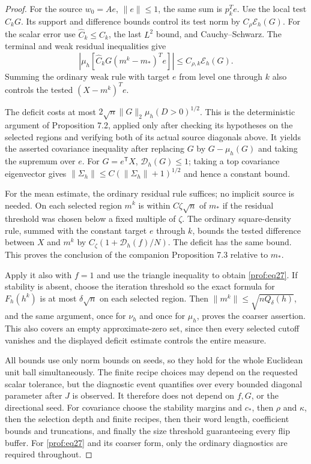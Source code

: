 \begin{proof}
For the source \(w_0=Ae\), \(\|e\|\le1\), the same sum is
\(p_k^Te\). Use the local test \(\widehat C_kG\).
Its support and difference bounds control its test norm by
\(C_\rho\mathcal E_h(G)\). For the scalar error use
\(\widehat C_k\le C_k\), the last \(L^2\) bound, and
Cauchy--Schwarz. The terminal and weak residual inequalities give
\[
 |\mu_h[\widehat C_kG(m^k-m_*)^Te]|
       \le C_{\rho,k}\mathcal E_h(G).
\]
Summing the ordinary weak rule with target \(e\) from level one
through \(k\) also controls the tested \((X-m^k)^Te\).

The deficit costs at most
$2\sqrt n\|G\|_2\mu_h(D>0)^{1/2}$.
This is the deterministic argument of Proposition 7.2, applied only
after checking its hypotheses on the selected regions and verifying
both of its actual source diagonals above.  It yields the asserted covariance inequality after
replacing $G$ by $G-\mu_h(G)$ and taking the supremum over $e$.
For $G=e^{\mathsf T}X$, $\mathcal D_h(G)\le1$; taking a top covariance
eigenvector gives $\|\Sigma_h\|\le C(\|\Sigma_h\|+1)^{1/2}$ and hence
a constant bound.

For the mean estimate, the ordinary residual rule suffices; no implicit
source is needed.  On each selected
region $m^k$ is within $C\zeta\sqrt n$ of $m_*$ if the residual
threshold was chosen below a fixed multiple of $\zeta$.
The ordinary square-density rule, summed with the constant target $e$
through $k$, bounds the tested difference between $X$ and $m^k$ by
$C_\zeta(1+\mathcal D_h(f)/N)$.  The deficit has the same bound.
This proves the conclusion of the companion Proposition 7.3 relative
to $m_*$.

Apply it also with $f=1$ and use the triangle inequality
to obtain \eqref{prof:eq27}.
If stability is absent, choose the iteration threshold so the exact
formula for $F_h(h^k)$ is at most $\delta\sqrt n$ on each selected
region.  Then $\|m^k\|\le\sqrt{nQ_\delta(h)}$, and the same argument,
once for $\nu_h$ and once for $\mu_h$, proves the coarser assertion.
This also covers an empty approximate-zero set, since then every
selected cutoff vanishes and the displayed deficit estimate controls
the entire measure.

All bounds use only norm bounds on seeds, so they hold for the whole
Euclidean unit ball simultaneously.  The finite recipe choices may
depend on the requested scalar tolerance, but the diagnostic event
quantifies over every bounded diagonal parameter after $J$ is observed.
It therefore does not depend on $f,G$, or the directional seed.
For covariance choose the stability margins and $c_*$, then $\rho$
and $\kappa$, then the selection depth and finite recipes, then their
word length, coefficient bounds and truncations, and finally the
size threshold guaranteeing every flip buffer.  For
\eqref{prof:eq27} and its coarser form, only the ordinary diagnostics
are required throughout.
\end{proof}

